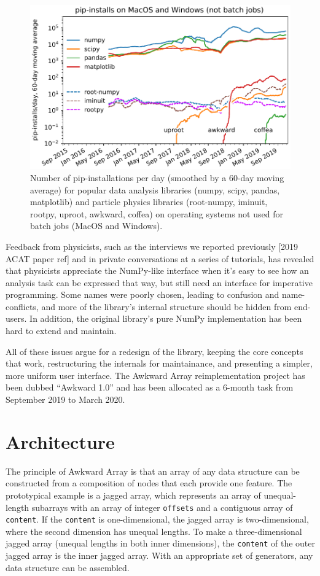 \documentclass{webofc}
\begin{document}
\begin{figure}
\begin{center}
\includegraphics[width=0.7\linewidth]{pip-timeline.pdf}
\end{center}
\caption{Number of pip-installations per day (smoothed by a 60-day moving average) for popular data analysis libraries (numpy, scipy, pandas, matplotlib) and particle physics libraries (root-numpy, iminuit, rootpy, uproot, awkward, coffea) on operating systems not used for batch jobs (MacOS and Windows). \label{fig:pip-timeline}}
\end{figure}

Feedback from physicists, such as the interviews we reported previously [2019 ACAT paper ref] and in private conversations at a series of tutorials, has revealed that physicists appreciate the NumPy-like interface when it's easy to see how an analysis task can be expressed that way, but still need an interface for imperative programming. Some names were poorly chosen, leading to confusion and name-conflicts, and more of the library's internal structure should be hidden from end-users. In addition, the original library's pure NumPy implementation has been hard to extend and maintain.

All of these issues argue for a redesign of the library, keeping the core concepts that work, restructuring the internals for maintainance, and presenting a simpler, more uniform user interface. The Awkward Array reimplementation project has been dubbed ``Awkward 1.0'' and has been allocated as a 6-month task from September 2019 to March 2020.

\section{Architecture}

The principle of Awkward Array is that an array of any data structure can be constructed from a composition of nodes that each provide one feature. The prototypical example is a jagged array, which represents an array of unequal-length subarrays with an array of integer \texttt{offsets} and a contiguous array of \texttt{content}. If the \texttt{content} is one-dimensional, the jagged array is two-dimensional, where the second dimension has unequal lengths. To make a three-dimensional jagged array (unequal lengths in both inner dimensions), the \texttt{content} of the outer jagged array is the inner jagged array. With an appropriate set of generators, any data structure can be assembled.
\end{document}
